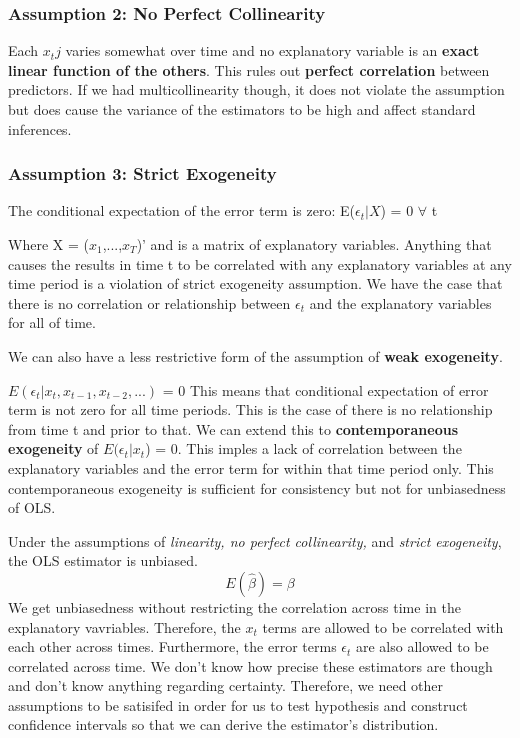 \documentclass[11pt, oneside]{article}
\theoremstyle{definition}
\begin{document}
\subsubsection{Assumption 2: No Perfect Collinearity}
Each $x_tj$ varies somewhat over time and no explanatory variable is an \textbf{exact linear function of the others}. This rules out \textbf{perfect correlation} between predictors. If we had multicollinearity though, it does not violate the assumption but does cause the variance of the estimators to be high and affect standard inferences.

\subsubsection{Assumption 3: Strict Exogeneity}
The conditional expectation of the error term is zero:
E($\epsilon_t|X$) = 0  $\forall$ t

Where X = ($x_1$,...,$x_T$)' and is a matrix of explanatory variables. Anything that causes the results in time t to be correlated with any explanatory variables at any time period is a violation of strict exogeneity assumption. We have the case that there is no correlation or relationship between $\epsilon_t$ and the explanatory variables for all of time.

We can also have a less restrictive form of the assumption of \textbf{weak exogeneity}.

$E(\epsilon_t|x_t,x_{t-1},x_{t-2},...)$ = 0
This means that conditional expectation of error term is not zero for all time periods. This is the case of there is no relationship from time t and prior to that. We can extend this to \textbf{contemporaneous exogeneity} of $E(\epsilon_t$$|$$x_t$) = 0. This imples a lack of correlation between the explanatory variables and the error term for within that time period only. This contemporaneous exogeneity is sufficient for consistency but not for unbiasedness of OLS.

Under the assumptions of \textit{linearity, no perfect collinearity,} and \textit{strict exogeneity}, the OLS estimator is unbiased.
\begin{equation}
  E(\hat{\beta}) = \beta
\end{equation}
We get unbiasedness without restricting the correlation across time in the explanatory vavriables. Therefore, the $x_t$ terms are allowed to be correlated with each other across times. Furthermore, the error terms $\epsilon_t$ are also allowed to be correlated across time. We don't know how precise these estimators are though and don't know anything regarding certainty. Therefore, we need other assumptions to be satisifed in order for us to test hypothesis and construct confidence intervals so that we can derive the estimator's distribution.
\end{document}
